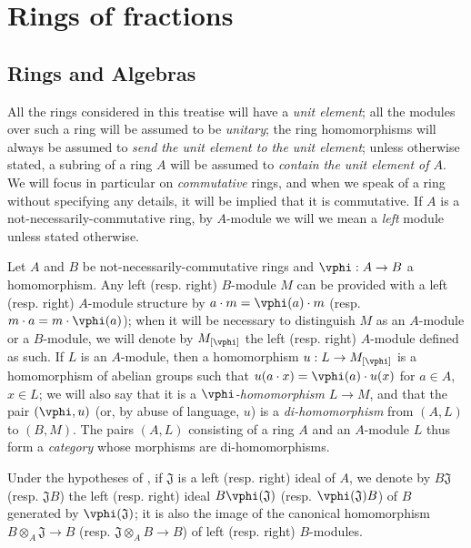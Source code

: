 \section{Rings of fractions}
\label{section:0.1}

\setcounter{subsection}{-1}
\subsection{Rings and Algebras}
\label{subsection:0.1.0}

\begin{env}[1.0.1]
\label{0.1.0.1}
All the rings considered in this treatise will have a \emph{unit element};
all the modules over such a ring will be assumed to be \emph{unitary};
the ring homomorphisms will always be assumed to \emph{send the unit element to the unit element};
unless otherwise stated, a subring of a ring $A$ will be assumed to \emph{contain the unit element of $A$}.
We will focus in particular on \emph{commutative} rings, and when we speak of a ring without specifying any details, it will be implied that it is commutative.
If $A$ is a not-necessarily-commutative ring, by $A$-module we will we mean a \emph{left} module unless stated otherwise.
\end{env}

\begin{env}[1.0.2]
\label{0.1.0.2}
Let $A$ and $B$ be not-necessarily-commutative rings and $\vphi:A\to B$ a homomorphism.
Any left (resp. right) $B$-module $M$ can be provided with a left (resp. right) $A$-module structure by $a\cdot m=\vphi(a)\cdot m$ (resp. $m\cdot a=m\cdot\vphi(a)$);
when it will be necessary to distinguish $M$ as an $A$-module or a $B$-module, we will denote by $M_{[\vphi]}$ the left (resp. right) $A$-module defined as such.
If $L$ is an $A$-module, then a homomorphism $u:L\to M_{[\vphi]}$ is a homomorphism of abelian groups such that $u(a\cdot x)=\vphi(a)\cdot u(x)$ for $a\in A$, $x\in L$;
we will also say that it is a \emph{$\vphi$-homomorphism} $L\to M$, and that the pair $(\vphi,u)$ (or, by abuse of language, $u$) is a \emph{di-homomorphism} from $(A,L)$ to $(B,M)$.
The pairs $(A,L)$ consisting of a ring $A$ and an $A$-module $L$ thus form a \emph{category} whose morphisms are di-homomorphisms.
\end{env}

\begin{env}[1.0.3]
\label{0.1.0.3}
Under the hypotheses of , if $\mathfrak{J}$ is a left (resp. right) ideal of $A$, we denote by $B\mathfrak{J}$ (resp. $\mathfrak{J}B$) the left (resp. right) ideal $B\vphi(\mathfrak{J})$ (resp. $\vphi(\mathfrak{J})B$) of $B$ generated by $\vphi(\mathfrak{J})$;
it is also the image of the canonical homomorphism $B\otimes_A\mathfrak{J}\to B$ (resp. $\mathfrak{J}\otimes_A B\to B$) of left (resp. right) $B$-modules.
\end{env}

